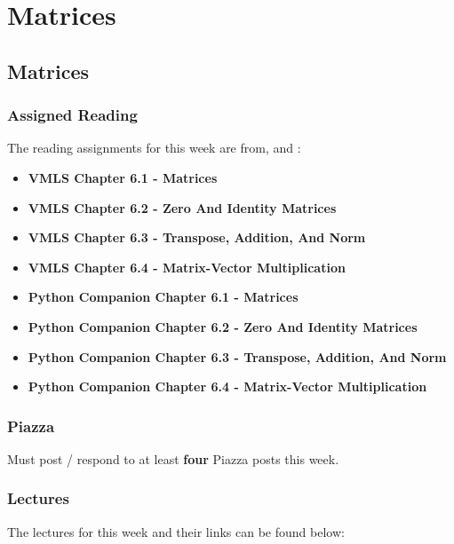 \clearpage

\renewcommand{\ChapTitle}{Matrices}
\renewcommand{\SectionTitle}{Matrices}

\chapter{\ChapTitle}
\section{\SectionTitle}

\subsection{Assigned Reading}

The reading assignments for this week are from, \VMLS \hspace*{1pt} and \PyCap:

\begin{itemize}
    \item \textbf{VMLS Chapter 6.1 - Matrices}
    \item \textbf{VMLS Chapter 6.2 - Zero And Identity Matrices}
    \item \textbf{VMLS Chapter 6.3 - Transpose, Addition, And Norm}
    \item \textbf{VMLS Chapter 6.4 - Matrix-Vector Multiplication}
    \item \textbf{Python Companion Chapter 6.1 - Matrices}
    \item \textbf{Python Companion Chapter 6.2 - Zero And Identity Matrices}
    \item \textbf{Python Companion Chapter 6.3 - Transpose, Addition, And Norm}
    \item \textbf{Python Companion Chapter 6.4 - Matrix-Vector Multiplication}
\end{itemize}

\subsection{Piazza}

Must post / respond to at least \textbf{four} Piazza posts this week.

\subsection{Lectures}

The lectures for this week and their links can be found below:

